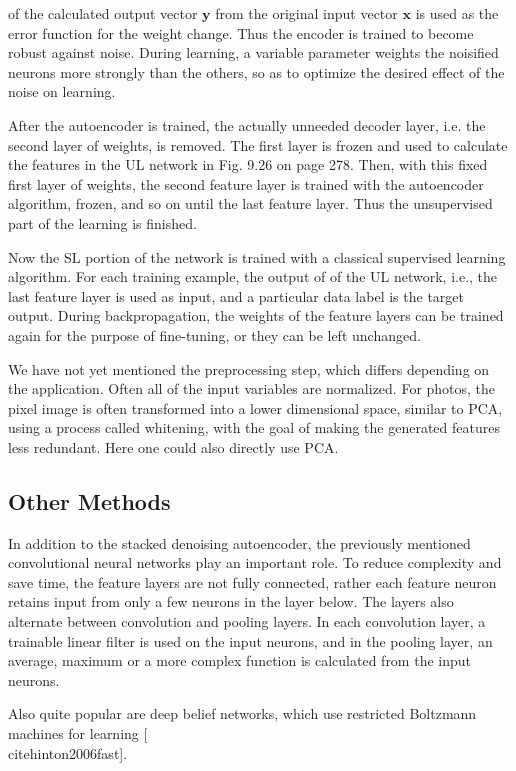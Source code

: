 \documentclass[10pt]{book}
\begin{document}
of the calculated output vector $\boldsymbol{y}$ from the original input vector $\boldsymbol{x}$ is used as the error function for the weight change. Thus the encoder is trained to become robust against noise. During learning, a variable parameter weights the noisified neurons more strongly than the others, so as to optimize the desired effect of the noise on learning.

After the autoencoder is trained, the actually unneeded decoder layer, i.e. the second layer of weights, is removed. The first layer is frozen and used to calculate the features in the UL network in Fig. 9.26 on page 278. Then, with this fixed first layer of weights, the second feature layer is trained with the autoencoder algorithm, frozen, and so on until the last feature layer. Thus the unsupervised part of the learning is finished.

Now the SL portion of the network is trained with a classical supervised learning algorithm. For each training example, the output of of the UL network, i.e., the last feature layer is used as input, and a particular data label is the target output. During backpropagation, the weights of the feature layers can be trained again for the purpose of fine-tuning, or they can be left unchanged.

We have not yet mentioned the preprocessing step, which differs depending on the application. Often all of the input variables are normalized. For photos, the pixel image is often transformed into a lower dimensional space, similar to PCA, using a process called whitening, with the goal of making the generated features less redundant. Here one could also directly use PCA.

\subsection{Other Methods}
In addition to the stacked denoising autoencoder, the previously mentioned convolutional neural networks play an important role. To reduce complexity and save time, the feature layers are not fully connected, rather each feature neuron retains input from only a few neurons in the layer below. The layers also alternate between convolution and pooling layers. In each convolution layer, a trainable linear filter is used on the input neurons, and in the pooling layer, an average, maximum or a more complex function is calculated from the input neurons.

Also quite popular are deep belief networks, which use restricted Boltzmann machines for learning [\\cite{hinton2006fast}].
\end{document}
